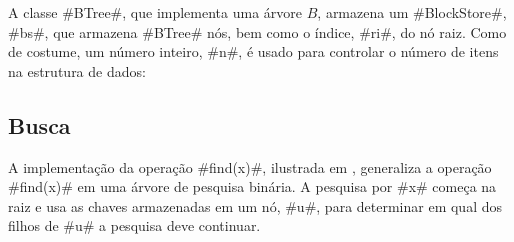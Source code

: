 A classe #BTree#, que implementa uma árvore $B$, armazena um #BlockStore#, #bs#, que armazena #BTree# nós, bem como o índice, #ri#, do nó raiz. Como de costume, um número inteiro, #n#, é usado para controlar o número de itens na estrutura de dados:

\subsection{Busca}

A implementação da operação #find(x)#, ilustrada em , generaliza a operação #find(x)# em uma árvore de pesquisa binária. A pesquisa por #x# começa na raiz e usa as chaves armazenadas em um nó, #u#, para determinar em qual dos filhos de #u# a pesquisa deve continuar.

